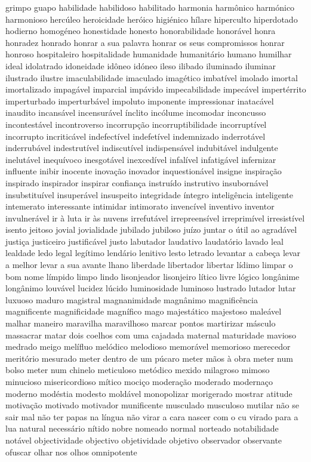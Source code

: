 grimpo guapo habilidade habilidoso habilitado harmonia harm\^{o}nico harm\'{o}nico harmonioso herc\'{u}leo heroicidade her\'{o}ico higi\'{e}nico h\'{i}lare hiperculto hiperdotado hodierno homog\'{e}neo honestidade honesto honorabilidade honor\'{a}vel honra honradez honrado honrar a sua palavra honrar os seus compromissos honrar honroso hospitaleiro hospitalidade humanidade humanit\'{a}rio humano humilhar ideal idolatrado idoneidade id\^{o}neo id\'{o}neo ileso ilibado iluminado iluminar ilustrado ilustre imaculabilidade imaculado imag\'{e}tico imbat\'{i}vel imolado imortal imortalizado impag\'{a}vel imparcial imp\'{a}vido impecabilidade impec\'{a}vel impert\'{e}rrito imperturbado imperturb\'{a}vel impoluto imponente impressionar inatac\'{a}vel inaudito incans\'{a}vel incensur\'{a}vel \'{i}nclito inc\'{o}lume incomodar inconcusso incontest\'{a}vel incontroverso incorrup\c{c}\~ao incorruptibilidade incorrupt\'{i}vel incorrupto incritic\'{a}vel indefect\'{i}vel indefet\'{i}vel indemnizado inderrot\'{a}vel inderrub\'{a}vel indestrut\'{i}vel indiscut\'{i}vel indispens\'{a}vel indubit\'{a}vel indulgente inelut\'{a}vel inequ\'{i}voco inesgot\'{a}vel inexced\'{i}vel infal\'{i}vel infatig\'{a}vel infernizar influente inibir inocente inova\c{c}\~ao inovador inquestion\'{a}vel insigne inspira\c{c}\~ao inspirado inspirador inspirar confian\c{c}a instru\'{i}do instrutivo insuborn\'{a}vel insubstitu\'{i}vel insuper\'{a}vel insuspeito integridade \'{i}ntegro intelig\^{e}ncia inteligente intemerato interessante intimidar intimorato invenc\'{i}vel inventivo inventor invulner\'{a}vel ir \`{a} luta ir \`{a}s nuvens irrefut\'{a}vel irrepreens\'{i}vel irreprim\'{i}vel irresist\'{i}vel isento jeitoso jovial jovialidade jubilado jubiloso ju\'{i}zo juntar o \'{u}til ao agrad\'{a}vel justi\c{c}a justiceiro justific\'{a}vel justo labutador laudativo laudat\'{o}rio lavado leal lealdade ledo legal leg\'{i}timo lend\'{a}rio lenitivo lesto letrado levantar a cabe\c{c}a levar a melhor levar a sua avante lhano liberdade libertador libertar l\'{i}dimo limpar o bom nome l\'{i}mpido limpo lindo lisonjeador lisonjeiro l\'{i}tico livre l\'{o}gico long\^{a}nime long\^{a}nimo louv\'{a}vel lucidez l\'{u}cido luminosidade luminoso lustrado lutador lutar luxuoso maduro magistral magnanimidade magn\^{a}nimo magnific\^{e}ncia magnificente magnificidade magn\'{i}fico mago majest\'{a}tico majestoso male\'{a}vel malhar maneiro maravilha maravilhoso marcar pontos martirizar m\'{a}sculo massacrar matar dois coelhos com uma cajadada maternal maturidade mavioso medrado meigo mel\'{i}fluo mel\'{o}dico melodioso memor\'{a}vel memorioso merecedor merit\'{o}rio mesurado meter dentro de um p\'{u}caro meter m\~aos \`{a} obra meter num bolso meter num chinelo meticuloso met\'{o}dico mexido milagroso mimoso minucioso misericordioso m\'{i}tico moci\c{c}o modera\c{c}\~ao moderado moderna\c{c}o moderno mod\'{e}stia modesto mold\'{a}vel monopolizar morigerado mostrar atitude motiva\c{c}\~ao motivado motivador munificente musculado musculoso mutilar n\~ao se sair mal n\~ao ter papas na l\'{i}ngua n\~ao virar a cara nascer com o cu virado para a lua natural necess\'{a}rio n\'{i}tido nobre nomeado normal norteado notabilidade not\'{a}vel objectividade objectivo objetividade objetivo observador observante ofuscar olhar nos olhos omnipotente 